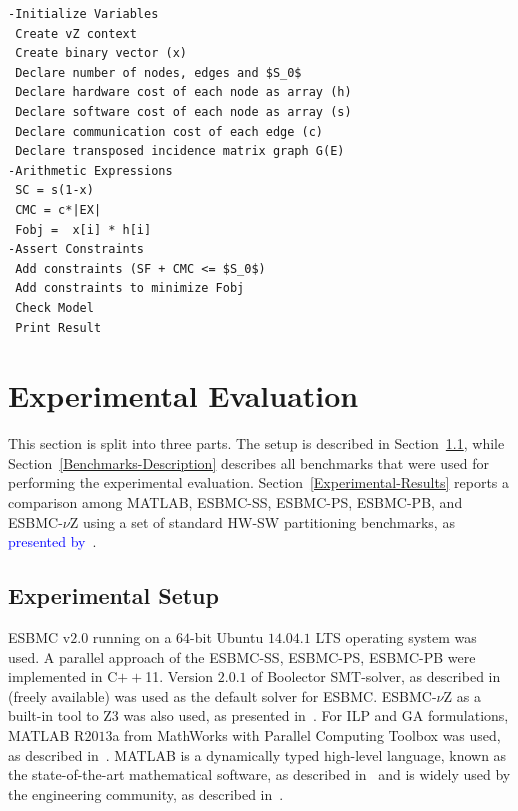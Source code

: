 \documentclass{doublecol-new}
\theoremstyle{TH}{
\newtheorem{lemma}{Lemma}
\newtheorem{theorem}[lemma]{Theorem}
\newtheorem{corrolary}[lemma]{Corrolary}
\newtheorem{conjecture}[lemma]{Conjecture}
\newtheorem{proposition}[lemma]{Proposition}
\newtheorem{claim}[lemma]{Claim}
\newtheorem{stheorem}[lemma]{Wrong Theorem}
\newtheorem{algorithm}{Algorithm}
}
\theoremstyle{THrm}{
\newtheorem{definition}{Definition}[section]
\newtheorem{question}{Question}[section]
\newtheorem{remark}{Remark}
\newtheorem{scheme}{Scheme}
}
\theoremstyle{THhit}{
\newtheorem{case}{Case}[section]
}
\begin{document}
\begin{lstlisting}[basicstyle=\footnotesize,caption={Pseudocode describing ESBMC-$\nu$Z.},label={vZ-pseudocode},numbersep=7pt,frame=tb,captionpos=t,numberstyle=\tiny,mathescape=true]
-Initialize Variables
 Create vZ context 
 Create binary vector (x)
 Declare number of nodes, edges and $S_0$
 Declare hardware cost of each node as array (h) 
 Declare software cost of each node as array (s)
 Declare communication cost of each edge (c)
 Declare transposed incidence matrix graph G(E)
-Arithmetic Expressions
 SC = s(1-x)
 CMC = c*|EX|
 Fobj =  x[i] * h[i]
-Assert Constraints
 Add constraints (SF + CMC <= $S_0$)
 Add constraints to minimize Fobj
 Check Model
 Print Result
\end{lstlisting}

\section{Experimental Evaluation}
\label{Experimental-Evaluation}

This section is split into three parts. The setup is described in Section~\ref{Experimental-Setup}, while Section~\ref{Benchmarks-Description} describes all benchmarks that were used for performing the experimental evaluation. Section~\ref{Experimental-Results} reports a comparison among MATLAB, ESBMC-SS, ESBMC-PS, ESBMC-PB, and ESBMC-$\nu$Z using a set of standard HW-SW partitioning benchmarks, as \textcolor{blue}{presented by}~\cite{Mann2007}.

\subsection{Experimental Setup}
\label{Experimental-Setup}

ESBMC v$2$.$0$ running on a $64$-bit Ubuntu $14$.$04$.$1$ LTS operating system was used. A parallel approach of the ESBMC-SS, ESBMC-PS, ESBMC-PB were implemented in C$++$11. Version $2$.$0$.$1$ of Boolector SMT-solver, as described in~\cite{Brummayer2009} (freely available) was used as the default solver for ESBMC. ESBMC-$\nu$Z as a built-in tool to Z3 was also used, as presented in~\cite{Bjorner2014}. For ILP and GA formulations, MATLAB R$2013$a from MathWorks with Parallel Computing Toolbox was used, as described in~\cite{TheMathWorks2013}. MATLAB is a dynamically typed high-level language, known as the state-of-the-art mathematical software, as described in~\cite{Tranquillo2011} and is widely used by the engineering community, as described in~\cite{Hong2010}.
\end{document}
